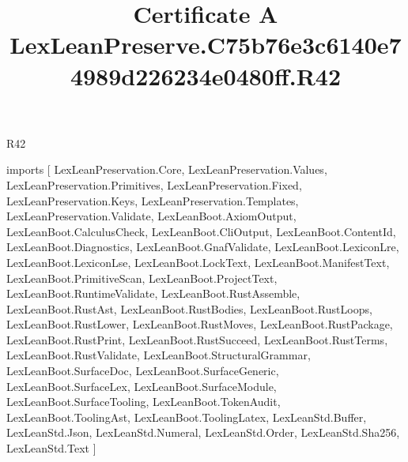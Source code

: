 \begin{lexlean}{R42}
\title{Certificate A LexLeanPreserve.C75b76e3c6140e74989d226234e0480ff.R42}
\begin{coremodule}
imports [
  LexLeanPreservation.Core,
  LexLeanPreservation.Values,
  LexLeanPreservation.Primitives,
  LexLeanPreservation.Fixed,
  LexLeanPreservation.Keys,
  LexLeanPreservation.Templates,
  LexLeanPreservation.Validate,
  LexLeanBoot.AxiomOutput,
  LexLeanBoot.CalculusCheck,
  LexLeanBoot.CliOutput,
  LexLeanBoot.ContentId,
  LexLeanBoot.Diagnostics,
  LexLeanBoot.GnafValidate,
  LexLeanBoot.LexiconLre,
  LexLeanBoot.LexiconLse,
  LexLeanBoot.LockText,
  LexLeanBoot.ManifestText,
  LexLeanBoot.PrimitiveScan,
  LexLeanBoot.ProjectText,
  LexLeanBoot.RuntimeValidate,
  LexLeanBoot.RustAssemble,
  LexLeanBoot.RustAst,
  LexLeanBoot.RustBodies,
  LexLeanBoot.RustLoops,
  LexLeanBoot.RustLower,
  LexLeanBoot.RustMoves,
  LexLeanBoot.RustPackage,
  LexLeanBoot.RustPrint,
  LexLeanBoot.RustSucceed,
  LexLeanBoot.RustTerms,
  LexLeanBoot.RustValidate,
  LexLeanBoot.StructuralGrammar,
  LexLeanBoot.SurfaceDoc,
  LexLeanBoot.SurfaceGeneric,
  LexLeanBoot.SurfaceLex,
  LexLeanBoot.SurfaceModule,
  LexLeanBoot.SurfaceTooling,
  LexLeanBoot.TokenAudit,
  LexLeanBoot.ToolingAst,
  LexLeanBoot.ToolingLatex,
  LexLeanStd.Buffer,
  LexLeanStd.Json,
  LexLeanStd.Numeral,
  LexLeanStd.Order,
  LexLeanStd.Sha256,
  LexLeanStd.Text
]


\end{coremodule}
\end{lexlean}
